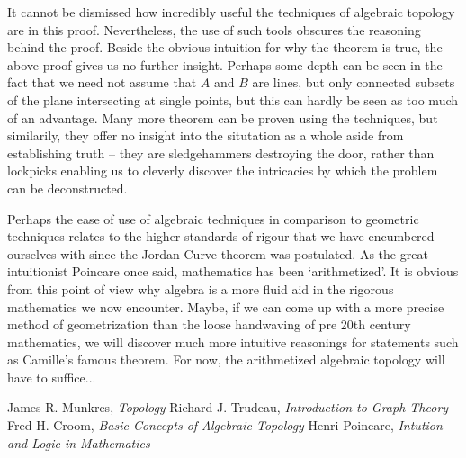\documentclass{article}
\begin{document}
It cannot be dismissed how incredibly useful the techniques of algebraic topology are in this proof. Nevertheless, the use of such tools obscures the reasoning behind the proof. Beside the obvious intuition for why the theorem is true, the above proof gives us no further insight. Perhaps some depth can be seen in the fact that we need not assume that $A$ and $B$ are lines, but only connected subsets of the plane intersecting at single points, but this can hardly be seen as too much of an advantage. Many more theorem can be proven using the techniques, but similarily, they offer no insight into the situtation as a whole aside from establishing truth -- they are sledgehammers destroying the door, rather than lockpicks enabling us to cleverly discover the intricacies by which the problem can be deconstructed.

Perhaps the ease of use of algebraic techniques in comparison to geometric techniques relates to the higher standards of rigour that we have encumbered ourselves with since the Jordan Curve theorem was postulated. As the great intuitionist Poincare once said, mathematics has been `arithmetized'. It is obvious from this point of view why algebra is a more fluid aid in the rigorous mathematics we now encounter. Maybe, if we can come up with a more precise method of geometrization than the loose handwaving of pre 20th century mathematics, we will discover much more intuitive reasonings for statements such as Camille's famous theorem. For now, the arithmetized algebraic topology will have to suffice...

\newpage

\begin{thebibliography}{10}
     James R. Munkres,
    \emph{Topology}
     Richard J. Trudeau,
    \emph{Introduction to Graph Theory}
     Fred H. Croom,
    \emph{Basic Concepts of Algebraic Topology}
     Henri Poincare,
    \emph{Intution and Logic in Mathematics}
\end{thebibliography}
\end{document}
